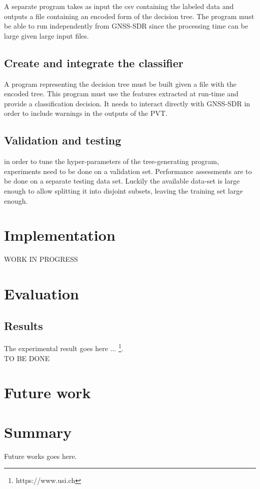 \documentclass[a4paper]{usiinfbachelorproject}
\begin{document}
A separate program takes as input the csv containing the labeled data and outputs a file containing an encoded form of the decision tree. The program must be able to run independently from GNSS-SDR since the processing time can be large given
large input files.

	\subsection{\textbf{Create and integrate the classifier}}
	
A program representing the decision tree must be built given a file with the encoded tree. This program must use the features extracted at run-time and provide a classification decision. It needs to interact directly with GNSS-SDR in order
to include warnings in the outputs of the PVT.
	
	\subsection{\textbf{Validation and testing}}
	
in order to tune the hyper-parameters of the tree-generating program, experiments need to be done on a validation set.
Performance assessments are to be done on a separate testing data set. Luckily the available data-set is large enough
to allow splitting it into disjoint subsets, leaving the training set large enough.
		
		
\section{\textbf{Implementation}}

WORK IN PROGRESS


\section{\textbf{Evaluation}}
	\subsection{\textbf{Results}}
	The experimental result goes here ... \footnote{https://www.usi.ch}. \\
	
 
TO BE DONE




		
\newpage
\section{\textbf{Future work}}

\section{\textbf{Summary}}
Future works goes here.






\newpage
	


\end{document}
